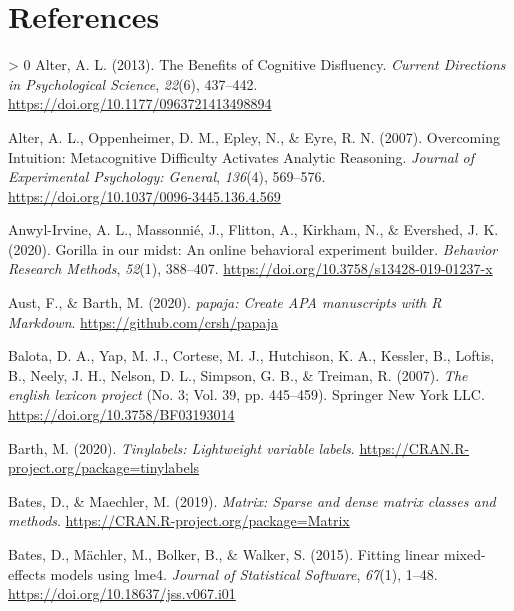 \documentclass[
  english,
  jou]{apa7}
\newlength{\cslhangindent}
\newenvironment{CSLReferences}[3] %
 {%
  \setlength{\parindent}{0pt}
  \ifodd #1 \everypar{\setlength{\hangindent}{\cslhangindent}}\ignorespaces\fi
  \ifnum #2 > 0
  \setlength{\parskip}{#2\baselineskip}
  \fi
 }%
 {}
\begin{document}
\newpage

\hypertarget{references}{%
\section{References}\label{references}}

\begingroup
\setlength{\parindent}{-0.5in}
\setlength{\leftskip}{0.5in}

\hypertarget{refs}{}
\begin{CSLReferences}{1}{0}
\leavevmode\hypertarget{ref-Alter2013}{}%
Alter, A. L. (2013). {The Benefits of Cognitive Disfluency}. \emph{Current Directions in Psychological Science}, \emph{22}(6), 437--442. \url{https://doi.org/10.1177/0963721413498894}

\leavevmode\hypertarget{ref-Alter2007}{}%
Alter, A. L., Oppenheimer, D. M., Epley, N., \& Eyre, R. N. (2007). {Overcoming Intuition: Metacognitive Difficulty Activates Analytic Reasoning}. \emph{Journal of Experimental Psychology: General}, \emph{136}(4), 569--576. \url{https://doi.org/10.1037/0096-3445.136.4.569}

\leavevmode\hypertarget{ref-Anwyl-Irvine2020}{}%
Anwyl-Irvine, A. L., Massonnié, J., Flitton, A., Kirkham, N., \& Evershed, J. K. (2020). {Gorilla in our midst: An online behavioral experiment builder}. \emph{Behavior Research Methods}, \emph{52}(1), 388--407. \url{https://doi.org/10.3758/s13428-019-01237-x}

\leavevmode\hypertarget{ref-R-papaja}{}%
Aust, F., \& Barth, M. (2020). \emph{{papaja}: {Create} {APA} manuscripts with {R Markdown}}. \url{https://github.com/crsh/papaja}

\leavevmode\hypertarget{ref-Balota2007}{}%
Balota, D. A., Yap, M. J., Cortese, M. J., Hutchison, K. A., Kessler, B., Loftis, B., Neely, J. H., Nelson, D. L., Simpson, G. B., \& Treiman, R. (2007). \emph{{The english lexicon project}} (No. 3; Vol. 39, pp. 445--459). Springer New York LLC. \url{https://doi.org/10.3758/BF03193014}

\leavevmode\hypertarget{ref-R-tinylabels}{}%
Barth, M. (2020). \emph{Tinylabels: Lightweight variable labels}. \url{https://CRAN.R-project.org/package=tinylabels}

\leavevmode\hypertarget{ref-R-Matrix}{}%
Bates, D., \& Maechler, M. (2019). \emph{Matrix: Sparse and dense matrix classes and methods}. \url{https://CRAN.R-project.org/package=Matrix}

\leavevmode\hypertarget{ref-R-lme4}{}%
Bates, D., Mächler, M., Bolker, B., \& Walker, S. (2015). Fitting linear mixed-effects models using {lme4}. \emph{Journal of Statistical Software}, \emph{67}(1), 1--48. \url{https://doi.org/10.18637/jss.v067.i01}


\end{CSLReferences}
\end{document}
